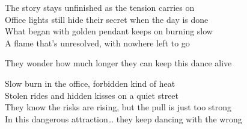 \begin{lyrics}
The story stays unfinished as the tension carries on\\
Office lights still hide their secret when the day is done\\
What began with golden pendant keeps on burning slow\\
A flame that’s unresolved, with nowhere left to go

They wonder how much longer they can keep this dance alive

Slow burn in the office, forbidden kind of heat\\
Stolen rides and hidden kisses on a quiet street\\
They know the risks are rising, but the pull is just too strong\\
In this dangerous attraction… they keep dancing with the wrong

\end{lyrics}

